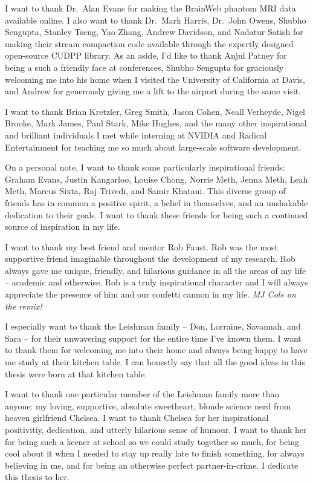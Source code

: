 I want to thank Dr.\ Alan Evans for making the BrainWeb phantom MRI data available online. I also want to thank Dr.\ Mark Harris, Dr.\ John Owens, Shubho Sengupta, Stanley Tseng, Yao Zhang, Andrew Davidson, and Nadatur Satish for making their stream compaction code available through the expertly designed open-source CUDPP library. As an aside, I'd like to thank Anjul Patney for being a such a friendly face at conferences, Shubho Sengupta for graciously welcoming me into his home when I visited the University of California at Davis, and Andrew for generously giving me a lift to the airport during the same visit.

\thispagestyle{plain}

I want to thank Brian Kretzler, Greg Smith, Jason Cohen, Neall Verheyde, Nigel Brooke, Mark James, Paul Stark, Mike Hughes, and the many other inspirational and brilliant individuals I met while interning at NVIDIA and Radical Entertainment for teaching me so much about large-scale software development. 

On a personal note, I want to thank some particularly inspirational friends: Graham Evans, Justin Kangarloo, Louise Chong, Norrie Meth, Jenna Meth, Leah Meth, Marcus Sixta, Raj Trivedi, and Samir Khatani. This diverse group of friends has in common a positive spirit, a belief in themselves, and an unshakable dedication to their goals. I want to thank these friends for being such a continued source of inspiration in my life.

I want to thank my best friend and mentor Rob Faust. Rob was the most supportive friend imaginable throughout the development of my research. Rob always gave me unique, friendly, and hilarious guidance in all the areas of my life -- academic and otherwise. Rob is a truly inspirational character and I will always appreciate the presence of him and our confetti cannon in my life. \emph{MJ Cole on the remix!}

I especially want to thank the Leishman family -- Don, Lorraine, Savannah, and Sara -- for their unwavering support for the entire time I've known them. I want to thank them for welcoming me into their home and always being happy to have me study at their kitchen table. I can honestly say that all the good ideas in this thesis were born at that kitchen table.

I want to thank one particular member of the Leishman family more than anyone: my loving, supportive, absolute sweetheart, blonde science nerd from heaven girlfriend Chelsea. I want to thank Chelsea for her inspirational positivitiy, dedication, and utterly hilarious sense of humour. I want to thank her for being such a keener at school so we could study together so much, for being cool about it when I needed to stay up really late to finish something, for always believing in me, and for being an otherwise perfect partner-in-crime. I dedicate this thesis to her.

\thispagestyle{plain}

